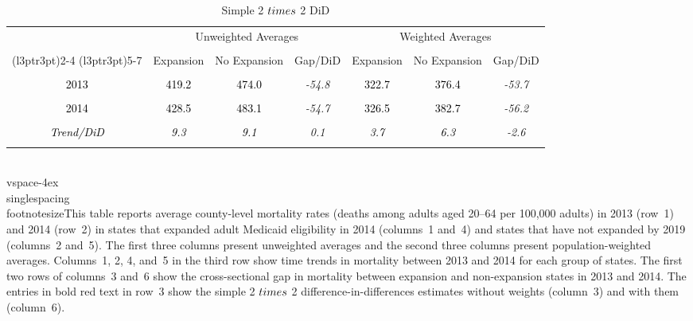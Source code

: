 \begin{table}[!h]
\centering
\caption{\label{tab:two_by_two_ex}Simple 2 $\\times$ 2 DiD}
\centering
\fontsize{12}{14}\selectfont
\begin{threeparttable}
\begin{tabular}[t]{>{}c>{}c>{}c>{}c>{}c>{}c>{}c}
\toprule
\multicolumn{1}{c}{ } & \multicolumn{3}{c}{Unweighted Averages} & \multicolumn{3}{c}{Weighted Averages} \\\\
\cmidrule(l{3pt}r{3pt}){2-4} \cmidrule(l{3pt}r{3pt}){5-7}
 & Expansion & No Expansion & Gap/DiD & Expansion & No Expansion & Gap/DiD\\\\
\midrule
\textcolor{black}{2013} & \textcolor{black}{ 419.2} & \textcolor{black}{ 474.0} & \em{ -54.8} & \textcolor{black}{ 322.7} & \textcolor{black}{ 376.4} & \em{ -53.7}\\\\
\textcolor{black}{2014} & \textcolor{black}{ 428.5} & \textcolor{black}{ 483.1} & \em{ -54.7} & \textcolor{black}{ 326.5} & \textcolor{black}{ 382.7} & \em{ -56.2}\\\\
\em{\textcolor{black}{Trend/DiD}} & \em{\textcolor{black}{   9.3}} & \em{\textcolor{black}{   9.1}} & \em{\em{\textcolor{BrickRed}{   0.1}}} & \em{\textcolor{black}{   3.7}} & \em{\textcolor{black}{   6.3}} & \em{\em{\textcolor{BrickRed}{  -2.6}}}\\\\
\bottomrule
\end{tabular}
\begin{tablenotes}[para]
\item \\vspace{-4ex} \\singlespacing \\footnotesize{This table reports average county-level 
mortality rates (deaths among adults aged 20--64 per 100,000 adults) in 2013 (row~1) and 2014 (row~2) 
in states that expanded adult Medicaid eligibility in 2014 (columns~1 and~4) and states that have not expanded 
by 2019 (columns~2 and~5).  The first three columns present unweighted averages and the second three columns 
present population-weighted averages.  Columns~1, 2, 4, and~5 in the third row show time trends in mortality 
between 2013 and 2014 for each group of states.  The first two rows of columns~3 and~6 show the cross-sectional 
gap in mortality between expansion and non-expansion states in 2013 and 2014.  The entries in bold red text in 
row~3 show the simple 2 $\\times$ 2 difference-in-differences estimates without weights (column~3) and with them 
(column~6).}
\end{tablenotes}
\end{threeparttable}
\end{table}
